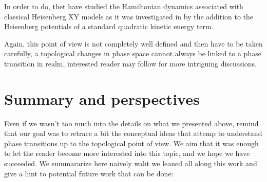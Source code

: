 \documentclass[a4paper,11pt]{article}
\begin{document}
In order to do, thet have studied the Hamiltonian dynamics associated with classical Heisenberg XY models as it was investigated in \cite{cerruti2000hamiltonian,Caiani_1997} by the addition to the Heisenberg potentials of a standard quadratic kinetic energy term.%


Again, this point of view is not completely well defined and then have to be taken carefully, a topological changes in phase space cannot always be linked to a phase transition in realm, interested reader may follow \cite{marco:hal-01260170} for more intriguing discussions.

\section{Summary and perspectives}

Even if we wasn't too much into the details on what we presented above, remind that our goal was to retrace a bit the conceptual ideas that attemp to understand phase transitions up to the topological point of view. We aim that it was enough to let the reader become more interested into this topic, and we hope we have succeeded. We summararize here naively waht we leaned all along this work and give a hint to potential future work that can be done:
\end{document}
